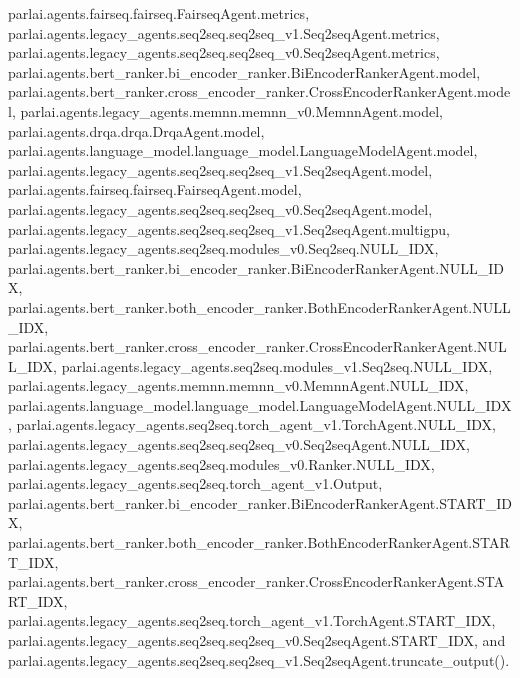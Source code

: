 parlai.\+agents.\+fairseq.\+fairseq.\+Fairseq\+Agent.\+metrics, parlai.\+agents.\+legacy\+\_\+agents.\+seq2seq.\+seq2seq\+\_\+v1.\+Seq2seq\+Agent.\+metrics, parlai.\+agents.\+legacy\+\_\+agents.\+seq2seq.\+seq2seq\+\_\+v0.\+Seq2seq\+Agent.\+metrics, parlai.\+agents.\+bert\+\_\+ranker.\+bi\+\_\+encoder\+\_\+ranker.\+Bi\+Encoder\+Ranker\+Agent.\+model, parlai.\+agents.\+bert\+\_\+ranker.\+cross\+\_\+encoder\+\_\+ranker.\+Cross\+Encoder\+Ranker\+Agent.\+model, parlai.\+agents.\+legacy\+\_\+agents.\+memnn.\+memnn\+\_\+v0.\+Memnn\+Agent.\+model, parlai.\+agents.\+drqa.\+drqa.\+Drqa\+Agent.\+model, parlai.\+agents.\+language\+\_\+model.\+language\+\_\+model.\+Language\+Model\+Agent.\+model, parlai.\+agents.\+legacy\+\_\+agents.\+seq2seq.\+seq2seq\+\_\+v1.\+Seq2seq\+Agent.\+model, parlai.\+agents.\+fairseq.\+fairseq.\+Fairseq\+Agent.\+model, parlai.\+agents.\+legacy\+\_\+agents.\+seq2seq.\+seq2seq\+\_\+v0.\+Seq2seq\+Agent.\+model, parlai.\+agents.\+legacy\+\_\+agents.\+seq2seq.\+seq2seq\+\_\+v1.\+Seq2seq\+Agent.\+multigpu, parlai.\+agents.\+legacy\+\_\+agents.\+seq2seq.\+modules\+\_\+v0.\+Seq2seq.\+N\+U\+L\+L\+\_\+\+I\+DX, parlai.\+agents.\+bert\+\_\+ranker.\+bi\+\_\+encoder\+\_\+ranker.\+Bi\+Encoder\+Ranker\+Agent.\+N\+U\+L\+L\+\_\+\+I\+DX, parlai.\+agents.\+bert\+\_\+ranker.\+both\+\_\+encoder\+\_\+ranker.\+Both\+Encoder\+Ranker\+Agent.\+N\+U\+L\+L\+\_\+\+I\+DX, parlai.\+agents.\+bert\+\_\+ranker.\+cross\+\_\+encoder\+\_\+ranker.\+Cross\+Encoder\+Ranker\+Agent.\+N\+U\+L\+L\+\_\+\+I\+DX, parlai.\+agents.\+legacy\+\_\+agents.\+seq2seq.\+modules\+\_\+v1.\+Seq2seq.\+N\+U\+L\+L\+\_\+\+I\+DX, parlai.\+agents.\+legacy\+\_\+agents.\+memnn.\+memnn\+\_\+v0.\+Memnn\+Agent.\+N\+U\+L\+L\+\_\+\+I\+DX, parlai.\+agents.\+language\+\_\+model.\+language\+\_\+model.\+Language\+Model\+Agent.\+N\+U\+L\+L\+\_\+\+I\+DX, parlai.\+agents.\+legacy\+\_\+agents.\+seq2seq.\+torch\+\_\+agent\+\_\+v1.\+Torch\+Agent.\+N\+U\+L\+L\+\_\+\+I\+DX, parlai.\+agents.\+legacy\+\_\+agents.\+seq2seq.\+seq2seq\+\_\+v0.\+Seq2seq\+Agent.\+N\+U\+L\+L\+\_\+\+I\+DX, parlai.\+agents.\+legacy\+\_\+agents.\+seq2seq.\+modules\+\_\+v0.\+Ranker.\+N\+U\+L\+L\+\_\+\+I\+DX, parlai.\+agents.\+legacy\+\_\+agents.\+seq2seq.\+torch\+\_\+agent\+\_\+v1.\+Output, parlai.\+agents.\+bert\+\_\+ranker.\+bi\+\_\+encoder\+\_\+ranker.\+Bi\+Encoder\+Ranker\+Agent.\+S\+T\+A\+R\+T\+\_\+\+I\+DX, parlai.\+agents.\+bert\+\_\+ranker.\+both\+\_\+encoder\+\_\+ranker.\+Both\+Encoder\+Ranker\+Agent.\+S\+T\+A\+R\+T\+\_\+\+I\+DX, parlai.\+agents.\+bert\+\_\+ranker.\+cross\+\_\+encoder\+\_\+ranker.\+Cross\+Encoder\+Ranker\+Agent.\+S\+T\+A\+R\+T\+\_\+\+I\+DX, parlai.\+agents.\+legacy\+\_\+agents.\+seq2seq.\+torch\+\_\+agent\+\_\+v1.\+Torch\+Agent.\+S\+T\+A\+R\+T\+\_\+\+I\+DX, parlai.\+agents.\+legacy\+\_\+agents.\+seq2seq.\+seq2seq\+\_\+v0.\+Seq2seq\+Agent.\+S\+T\+A\+R\+T\+\_\+\+I\+DX, and parlai.\+agents.\+legacy\+\_\+agents.\+seq2seq.\+seq2seq\+\_\+v1.\+Seq2seq\+Agent.\+truncate\+\_\+output().



